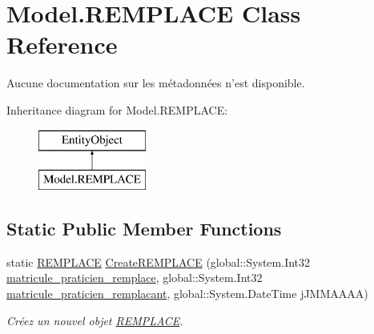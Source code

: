 \hypertarget{class_model_1_1_r_e_m_p_l_a_c_e}{\section{Model.\-R\-E\-M\-P\-L\-A\-C\-E Class Reference}
\label{class_model_1_1_r_e_m_p_l_a_c_e}
}


Aucune documentation sur les métadonnées n'est disponible.  


Inheritance diagram for Model.\-R\-E\-M\-P\-L\-A\-C\-E\-:\begin{figure}[H]
\begin{center}
\leavevmode
\includegraphics[height=2.000000cm]{class_model_1_1_r_e_m_p_l_a_c_e}
\end{center}
\end{figure}
\subsection*{Static Public Member Functions}
\begin{DoxyCompactItemize}
\item 
static \hyperlink{class_model_1_1_r_e_m_p_l_a_c_e}{R\-E\-M\-P\-L\-A\-C\-E} \hyperlink{class_model_1_1_r_e_m_p_l_a_c_e_adf148310a39f025b9b9f4c643eb2e89c}{Create\-R\-E\-M\-P\-L\-A\-C\-E} (global\-::\-System.\-Int32 \hyperlink{class_model_1_1_r_e_m_p_l_a_c_e_ac3e241e1a97864f915ca369bd99dfde3}{matricule\-\_\-praticien\-\_\-remplace}, global\-::\-System.\-Int32 \hyperlink{class_model_1_1_r_e_m_p_l_a_c_e_a43176ce5aac61a5dbb677d871f8f2c32}{matricule\-\_\-praticien\-\_\-remplacant}, global\-::\-System.\-Date\-Time j\-J\-M\-M\-A\-A\-A\-A)
\begin{DoxyCompactList}\small\item\em Créez un nouvel objet \hyperlink{class_model_1_1_r_e_m_p_l_a_c_e}{R\-E\-M\-P\-L\-A\-C\-E}. \end{DoxyCompactList}\end{DoxyCompactItemize}
